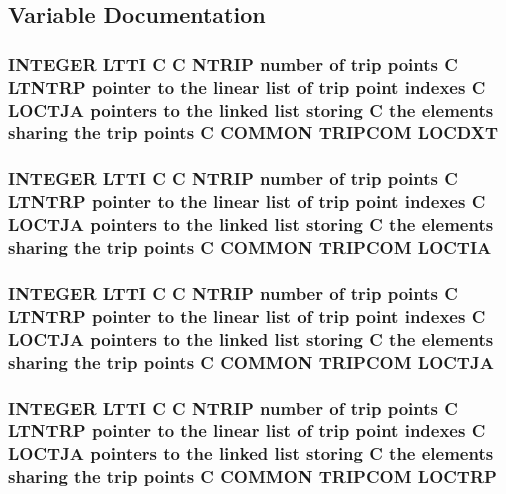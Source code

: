 \subsection{Variable Documentation}
\hypertarget{trip_8com_a23376c308ff91ab97412c3efa31ea746}{
\subsubsection[{L\-O\-C\-D\-X\-T}]{\setlength{\rightskip}{0pt plus 5cm}I\-N\-T\-E\-G\-E\-R L\-T\-T\-I C C {\bf N\-T\-R\-I\-P} number of trip points C L\-T\-N\-T\-R\-P pointer to the linear list of trip point indexes C {\bf L\-O\-C\-T\-J\-A} pointers to the linked list storing C the elements sharing the trip points C C\-O\-M\-M\-O\-N T\-R\-I\-P\-C\-O\-M L\-O\-C\-D\-X\-T}}\label{trip_8com_a23376c308ff91ab97412c3efa31ea746}
\hypertarget{trip_8com_a9410695829be46f3379b92d229aab0aa}{
\subsubsection[{L\-O\-C\-T\-I\-A}]{\setlength{\rightskip}{0pt plus 5cm}I\-N\-T\-E\-G\-E\-R L\-T\-T\-I C C {\bf N\-T\-R\-I\-P} number of trip points C L\-T\-N\-T\-R\-P pointer to the linear list of trip point indexes C {\bf L\-O\-C\-T\-J\-A} pointers to the linked list storing C the elements sharing the trip points C C\-O\-M\-M\-O\-N T\-R\-I\-P\-C\-O\-M L\-O\-C\-T\-I\-A}}\label{trip_8com_a9410695829be46f3379b92d229aab0aa}
\hypertarget{trip_8com_a6b0b8b0dad59abf485e0f27ae437ea82}{
\subsubsection[{L\-O\-C\-T\-J\-A}]{\setlength{\rightskip}{0pt plus 5cm}I\-N\-T\-E\-G\-E\-R L\-T\-T\-I C C {\bf N\-T\-R\-I\-P} number of trip points C L\-T\-N\-T\-R\-P pointer to the linear list of trip point indexes C L\-O\-C\-T\-J\-A pointers to the linked list storing C the elements sharing the trip points C C\-O\-M\-M\-O\-N T\-R\-I\-P\-C\-O\-M L\-O\-C\-T\-J\-A}}\label{trip_8com_a6b0b8b0dad59abf485e0f27ae437ea82}
\hypertarget{trip_8com_a7338c756eee0f214801ca3c7c3b5f6ee}{
\subsubsection[{L\-O\-C\-T\-R\-P}]{\setlength{\rightskip}{0pt plus 5cm}I\-N\-T\-E\-G\-E\-R L\-T\-T\-I C C {\bf N\-T\-R\-I\-P} number of trip points C L\-T\-N\-T\-R\-P pointer to the linear list of trip point indexes C {\bf L\-O\-C\-T\-J\-A} pointers to the linked list storing C the elements sharing the trip points C C\-O\-M\-M\-O\-N T\-R\-I\-P\-C\-O\-M L\-O\-C\-T\-R\-P}}\label{trip_8com_a7338c756eee0f214801ca3c7c3b5f6ee}
